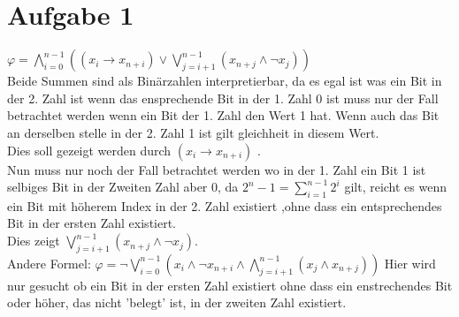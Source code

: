 \section*{Aufgabe 1}


$\varphi = \bigwedge_{i=0}^{n-1}((x_i \rightarrow x_{n+i}) \vee \bigvee_{j=i+1}^{n-1}( x_{n+j} \wedge \neg x_{j}))$ \\



Beide Summen sind als Binärzahlen interpretierbar, da es egal ist was ein Bit in der 2. Zahl ist wenn das ensprechende Bit in der 1. Zahl 0 ist muss nur der Fall betrachtet werden wenn ein Bit der 1. Zahl den Wert 1 hat. Wenn auch das Bit an derselben stelle in der 2. Zahl 1 ist gilt gleichheit in diesem Wert.\\

Dies soll gezeigt werden durch $(x_i \rightarrow x_{n+i})$ .\\


Nun muss nur noch der Fall betrachtet werden wo in der 1. Zahl ein Bit 1 ist selbiges Bit in der Zweiten Zahl aber 0, da $2^n-1 = \sum_{i=1}^{n-1}2^i$ gilt, reicht es wenn ein Bit mit höherem Index in der 2. Zahl existiert ,ohne dass ein entsprechendes Bit in der ersten Zahl existiert.\\

Dies zeigt $ \bigvee_{j=i+1}^{n-1}( x_{n+j} \wedge \neg x_{j})$. \\



Andere Formel: $ \varphi = \neg \bigvee_{i=0}^{n-1}(x_i \wedge \neg x_{n+i} \wedge \bigwedge_{j=i+1}^{n-1} (x_j \wedge x_{n+j}))$ 
Hier wird nur gesucht ob ein Bit in der ersten Zahl existiert ohne dass ein enstrechendes Bit oder höher, das nicht 'belegt' ist, in der zweiten Zahl existiert.